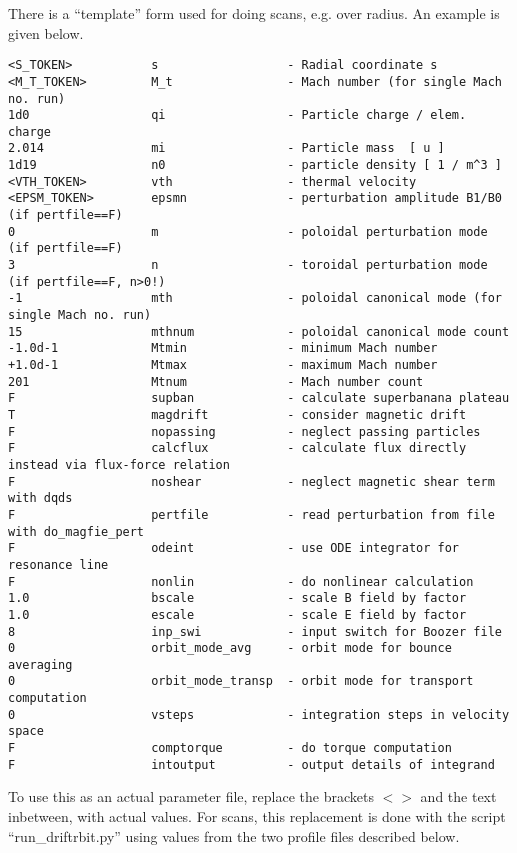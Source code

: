 There is a ``template'' form used for doing scans, e.g. over radius.
An example is given below.
\begin{verbatim}
<S_TOKEN>           s                  - Radial coordinate s
<M_T_TOKEN>         M_t                - Mach number (for single Mach no. run)
1d0                 qi                 - Particle charge / elem. charge
2.014               mi                 - Particle mass  [ u ]
1d19                n0                 - particle density [ 1 / m^3 ]
<VTH_TOKEN>         vth                - thermal velocity
<EPSM_TOKEN>        epsmn              - perturbation amplitude B1/B0 (if pertfile==F)
0                   m                  - poloidal perturbation mode (if pertfile==F)
3                   n                  - toroidal perturbation mode (if pertfile==F, n>0!)
-1                  mth                - poloidal canonical mode (for single Mach no. run)
15                  mthnum             - poloidal canonical mode count
-1.0d-1             Mtmin              - minimum Mach number
+1.0d-1             Mtmax              - maximum Mach number
201                 Mtnum              - Mach number count
F                   supban             - calculate superbanana plateau
T                   magdrift           - consider magnetic drift
F                   nopassing          - neglect passing particles
F                   calcflux           - calculate flux directly instead via flux-force relation
F                   noshear            - neglect magnetic shear term with dqds
F                   pertfile           - read perturbation from file with do_magfie_pert
F                   odeint             - use ODE integrator for resonance line
F                   nonlin             - do nonlinear calculation
1.0                 bscale             - scale B field by factor
1.0                 escale             - scale E field by factor
8                   inp_swi            - input switch for Boozer file
0                   orbit_mode_avg     - orbit mode for bounce averaging
0                   orbit_mode_transp  - orbit mode for transport computation
0                   vsteps             - integration steps in velocity space
F                   comptorque         - do torque computation
F                   intoutput          - output details of integrand
\end{verbatim}
To use this as an actual parameter file, replace the brackets $<>$ and
the text inbetween, with actual values.
For scans, this replacement is done with the script ``run_driftrbit.py''
using values from the two profile files described below.

